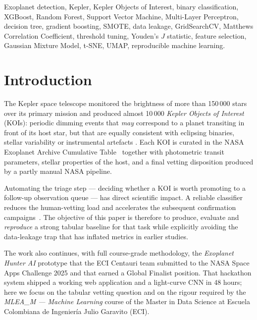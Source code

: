 \documentclass[conference]{IEEEtran}
\begin{document}
\begin{IEEEkeywords}
Exoplanet detection, Kepler, Kepler Objects of Interest, binary
classification, XGBoost, Random Forest, Support Vector Machine,
Multi-Layer Perceptron, decision tree, gradient boosting, SMOTE,
data leakage, GridSearchCV, Matthews Correlation Coefficient,
threshold tuning, Youden's $J$ statistic, feature selection,
Gaussian Mixture Model, t-SNE, UMAP, reproducible machine learning.
\end{IEEEkeywords}

\section{Introduction}

The Kepler space telescope monitored the brightness of more than
150\,000 stars over its primary mission and produced almost 10\,000
\emph{Kepler Objects of Interest} (KOIs): periodic dimming events that
\emph{may} correspond to a planet transiting in front of its host star,
but that are equally consistent with eclipsing binaries, stellar
variability or instrumental artefacts \cite{borucki2010kepler,
mcquillan2014rotation}. Each KOI is curated in the NASA Exoplanet
Archive Cumulative Table~\cite{koitable} together with photometric
transit parameters, stellar properties of the host, and a final
vetting disposition produced by a partly manual NASA pipeline.

Automating the triage step --- deciding whether a KOI is worth promoting
to a follow-up observation queue --- has direct scientific impact. A
reliable classifier reduces the human-vetting load and accelerates the
subsequent confirmation campaigns~\cite{shallue2018identifying,
malik2022exoplanet}. The objective of this paper is therefore to
produce, evaluate and \emph{reproduce} a strong tabular baseline for
that task while explicitly avoiding the data-leakage trap that has
inflated metrics in earlier studies.

The work also continues, with full course-grade methodology, the
\emph{Exoplanet Hunter AI} prototype that the ECI Centauri team
submitted to the NASA Space Apps Challenge 2025 and that earned a
Global Finalist position. That hackathon system shipped a working web
application and a light-curve CNN in 48 hours; here we focus on the
tabular vetting question and on the rigour required by the
\emph{MLEA\_M --- Machine Learning} course of the Master in Data
Science at Escuela Colombiana de Ingeniería Julio Garavito (ECI).
\end{document}
